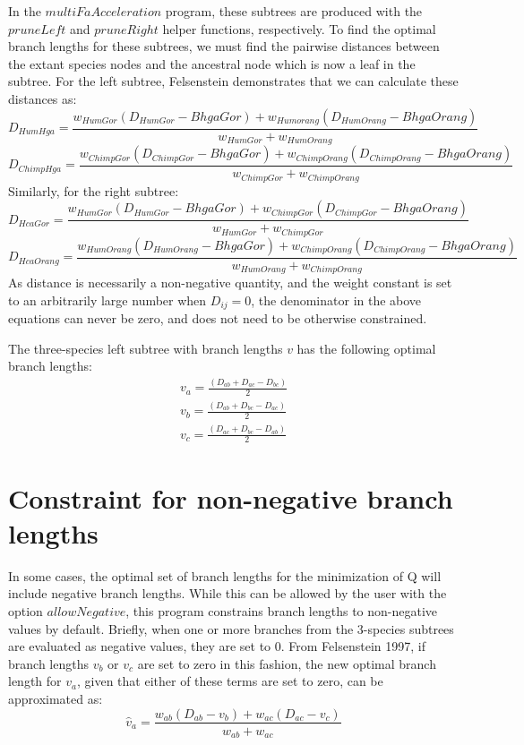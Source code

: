 \documentclass{article} %
\begin{document}
In the $multiFaAcceleration$ program, these subtrees are produced with the $pruneLeft$ and $pruneRight$ helper functions, respectively. To find the optimal branch lengths for these subtrees, we must find the pairwise distances between the extant species nodes and the ancestral node which is now a leaf in the subtree. For the left subtree, Felsenstein demonstrates that we can calculate these distances as:
\begin{equation*}
	D_{HumHga} = \frac{w_{HumGor}(D_{HumGor} - BhgaGor) + w_{Humorang}(D_{HumOrang} - BhgaOrang)}{w_{HumGor} + w_{HumOrang}}
\end{equation*}
\begin{equation*}
	D_{ChimpHga} = \frac{w_{ChimpGor}(D_{ChimpGor} - BhgaGor) + w_{ChimpOrang}(D_{ChimpOrang} - BhgaOrang)}{w_{ChimpGor} + w_{ChimpOrang}}
\end{equation*}
Similarly, for the right subtree:
\begin{equation*}
	D_{HcaGor} = \frac{w_{HumGor}(D_{HumGor} - BhgaGor) + w_{ChimpGor}(D_{ChimpGor} - BhgaOrang)}{w_{HumGor} + w_{ChimpGor}}
\end{equation*}
\begin{equation*}
	D_{HcaOrang} = \frac{w_{HumOrang}(D_{HumOrang} - BhgaGor) + w_{ChimpOrang}(D_{ChimpOrang} - BhgaOrang)}{w_{HumOrang} + w_{ChimpOrang}}
\end{equation*}
As distance is necessarily a non-negative quantity, and the weight constant is set to an arbitrarily large number when $D_{ij} = 0$, the denominator in the above equations can never be zero, and does not need to be otherwise constrained.\par
The three-species left subtree with branch lengths $v$ has the following optimal branch lengths:
\begin{equation*}
\begin{split}
v_a = \frac{(D_{ab} + D_{ac} - D_{bc})}{2}\\
v_b = \frac{(D_{ab} + D_{bc} - D_{ac})}{2}\\
v_c = \frac{(D_{ac} + D_{bc} - D_{ab})}{2}
\end{split}
\end{equation*}

\section{Constraint for non-negative branch lengths}
In some cases, the optimal set of branch lengths for the minimization of Q will include negative branch lengths. While this can be allowed by the user with the option $allowNegative$, this program constrains branch lengths to non-negative values by default. Briefly, when one or more branches from the 3-species subtrees are evaluated as negative values, they are set to 0. From Felsenstein 1997, if branch lengths $v_b$ or $v_c$ are set to zero in this fashion, the new optimal branch length for $v_a$, given that either of these terms are set to zero, can be approximated as:
\begin{equation*}
	\hat v_a = \frac{w_{ab}(D_{ab} - v_b) + w_{ac}(D_{ac} - v_c)}{w_{ab} + w_{ac}}
\end{equation*}
\end{document}
